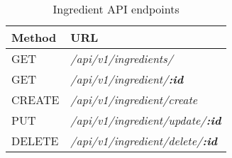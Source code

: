 \begin{table}[!h]
    \centering
    \caption{Ingredient API endpoints}
    \label{tab:ingredient-api}
    \begin{tabular}{|l|p{29em}|}
        \hline
        \textbf{Method} & \textbf{URL} \\
        \hline
        GET & \textit{/api/v1/ingredients/} \\
        \hline
        GET & \textit{/api/v1/ingredient/\textbf{:id}} \\
        \hline
        CREATE & \textit{/api/v1/ingredient/create} \\
        \hline
        PUT & \textit{/api/v1/ingredient/update/\textbf{:id}} \\
        \hline
        DELETE & \textit{/api/v1/ingredient/delete/\textbf{:id}} \\
        \hline
    \end{tabular}
\end{table}
